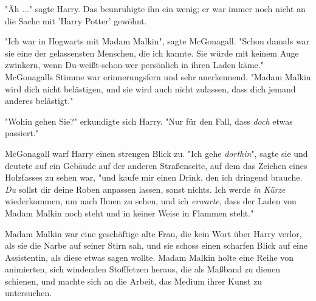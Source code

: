 "Äh ..." sagte Harry. Das beunruhigte ihn ein wenig; er war immer noch nicht an die Sache mit 'Harry Potter' gewöhnt. 

"Ich war in Hogwarts mit Madam Malkin", sagte McGonagall. "Schon damals war sie eine der gelassensten Menschen, die ich kannte. Sie würde mit keinem Auge zwinkern, wenn Du-weißt-schon-wer persönlich in ihren Laden käme." McGonagalls Stimme war erinnerungsfern und sehr anerkennend. "Madam Malkin wird dich nicht belästigen, und sie wird auch nicht zulassen, dass dich jemand anderes belästigt."

"Wohin gehen Sie?" erkundigte sich Harry. "Nur für den Fall, dass \emph{doch} etwas passiert."

McGonagall warf Harry einen strengen Blick zu. "Ich gehe \emph{dorthin}", sagte sie und deutete auf ein Gebäude auf der anderen Straßenseite, auf dem das Zeichen eines Holzfasses zu sehen war, "und kaufe mir einen Drink, den ich dringend brauche. \emph{Du} sollst dir deine Roben anpassen lassen, sonst nichts. Ich werde \emph{in Kürze} wiederkommen, um nach Ihnen zu sehen, und ich \emph{erwarte}, dass der Laden von Madam Malkin noch steht und in keiner Weise in Flammen steht." 

Madam Malkin war eine geschäftige alte Frau, die kein Wort über Harry verlor, als sie die Narbe auf seiner Stirn sah, und sie schoss einen scharfen Blick auf eine Assistentin, als diese etwas sagen wollte. Madam Malkin holte eine Reihe von animierten, sich windenden Stofffetzen heraus, die als Maßband zu dienen schienen, und machte sich an die Arbeit, das Medium ihrer Kunst zu untersuchen. 

